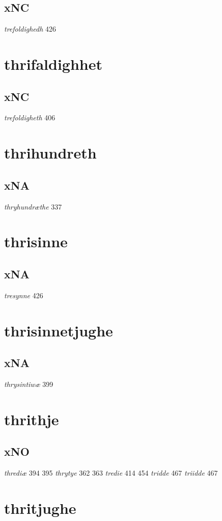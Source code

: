 \documentclass[a4paper,twocolumn]{article}
\begin{document}
\subsection{xNC}
\label{sec:org75be2f6}
\emph{trefoldighedh} 426 
\section{thrifaldighhet}
\label{sec:orgb3cc513}
\subsection{xNC}
\label{sec:org6174eba}
\emph{trefoldigheth} 406 
\section{thrihundreth}
\label{sec:org73d484f}
\subsection{xNA}
\label{sec:org7d85ae9}
\emph{thryhundræthe} 337 
\section{thrisinne}
\label{sec:org13f14ad}
\subsection{xNA}
\label{sec:org9f3c471}
\emph{tresynne} 426 
\section{thrisinnetjughe}
\label{sec:org4c2ae76}
\subsection{xNA}
\label{sec:orgcf72b83}
\emph{thrysintiwæ} 399 
\section{thrithje}
\label{sec:orgafa8387}
\subsection{xNO}
\label{sec:org3e35a13}
\emph{thrediæ} 394 395 \emph{thrytye} 362 363 \emph{tredie} 414 454 \emph{tridde} 467 \emph{triidde} 467 
\section{thritjughe}
\label{sec:org61b4a84}
\end{document}

